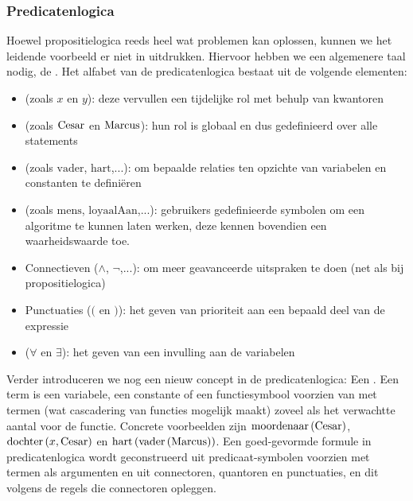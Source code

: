 \subsubsection{Predicatenlogica}
Hoewel propositielogica reeds heel wat problemen kan oplossen, kunnen we het leidende voorbeeld er niet in uitdrukken. Hiervoor hebben we een algemenere taal nodig, de . Het alfabet van de predicatenlogica bestaat uit de volgende elementen:
\begin{itemize}
 \item {} (zoals $x$ en $y$): deze vervullen een tijdelijke rol met behulp van kwantoren
 \item {} (zoals $\mbox{Cesar}$ en $\mbox{Marcus}$): hun rol is globaal en dus gedefinieerd over alle statements
 \item {} (zoals $\mbox{vader}$, $\mbox{hart}$,...): om bepaalde relaties ten opzichte van variabelen en constanten te defini\"eren
 \item {} (zoals $\mbox{mens}$, $\mbox{loyaalAan}$,...): gebruikers gedefinieerde symbolen om een algoritme te kunnen laten werken, deze kennen bovendien een waarheidswaarde toe.
 \item Connectieven ($\wedge$, $\neg$,...): om meer geavanceerde uitspraken te doen (net als bij propositielogica)
 \item Punctuaties ($($ en $)$): het geven van prioriteit aan een bepaald deel van de expressie
 \item {} ($\forall$ en $\exists$): het geven van een invulling aan de variabelen
\end{itemize}
Verder introduceren we nog een nieuw concept in de predicatenlogica: Een . Een term is een variabele, een constante of een functiesymbool voorzien van met termen (wat cascadering van functies mogelijk maakt) zoveel als het verwachtte aantal voor de functie. Concrete voorbeelden zijn $\mbox{moordenaar}\left( \mbox{Cesar} \right)$, $\mbox{dochter}\left( x,\mbox{Cesar} \right)$ en $\mbox{hart}\left( \mbox{vader}\left( \mbox{Marcus} \right) \right)$. Een goed-gevormde formule in predicatenlogica wordt geconstrueerd uit predicaat-symbolen voorzien met termen als argumenten en uit connectoren, quantoren en punctuaties, en dit volgens de regels die connectoren opleggen.
